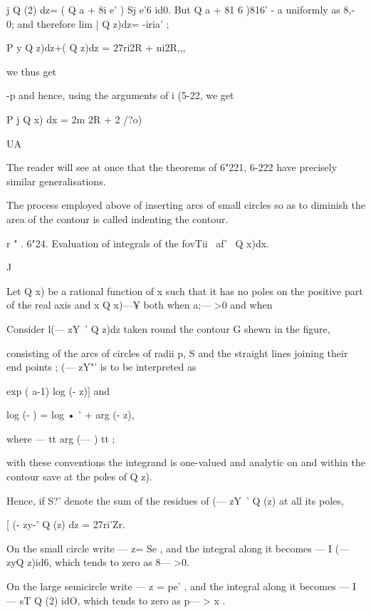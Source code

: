 j Q (2) dz= ( Q a + 8i e' ) Sj e'6 id0. But Q a + 81 6 )816' - a
uniformly as 8,- 0; and therefore lim | Q z)dz= -iria' ;

P y Q z)dz+( Q z)dz = 27ri2R + ni2R,,,



we thus get



-p and hence, using the arguments of i (5-22, we get



P j Q x) dx = 2m 2R + 2 /?o)



UA



The reader will see at once that the theorems of 6"221, 6-222 have
precisely similar generalisations.

The process employed above of inserting arcs of small circles so as to
diminish the area of the contour is called indenting the contour.

r " . 6"24. Evaluation of integrals of the fovTii \ af'~ Q x)dx.

J

Let Q x) be a rational function of x such that it has no poles on the
positive part of the real axis and x Q x)—¥ both when a;— >0 and when


%
%

Consider l(— zY~' Q z)dz taken round the contour G shewn in the
figure,



consisting of the arcs of circles of radii p, S and the straight lines
joining their end points ; (— zY"' is to be interpreted as

exp ( a-1) log (- z)] and

log (- ) = log • ' + arg (- z),

where — tt arg (— ) tt ;

with these conventions the integrand is one-valued and analytic on and
within the contour save at the poles of Q z).

Hence, if S?' denote the sum of the residues of (— zY~' Q (z) at all
its poles,




[ (- zy-' Q (z) dz = 27ri'Zr.



On the small circle write — z= Se , and the integral along it becomes
— I (— zyQ z)id6, which tends to zero as 8— >0.



On the large semicircle write — z = pe' , and the integral along it
becomes — I — sT Q (2) idO, which tends to zero as p— > x .

